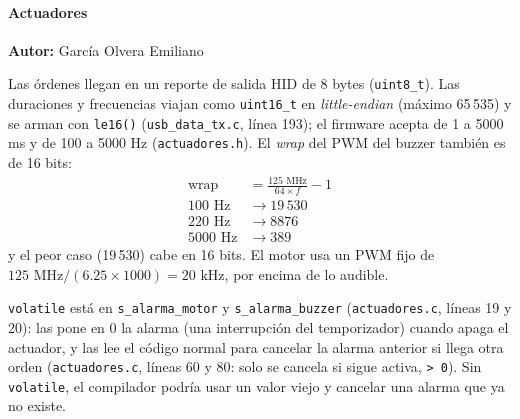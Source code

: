\paragraph{Actuadores}
\textbf{Autor:} García Olvera Emiliano

Las órdenes llegan en un reporte de salida HID de 8 bytes (\texttt{uint8\_t}). Las duraciones y frecuencias viajan
como \texttt{uint16\_t} en \textit{little-endian} (máximo 65\,535) y se arman con \texttt{le16()} (\texttt{usb\_data\_tx.c}, línea 193); el firmware acepta
de 1 a 5000 ms y de 100 a 5000 Hz (\texttt{actuadores.h}). El \textit{wrap} del PWM del buzzer también es de 16 bits:
\begin{align*}
\text{wrap} &= \frac{125\text{ MHz}}{64 \times f} - 1 \\
100\text{ Hz} &\rightarrow 19\,530 \\
220\text{ Hz} &\rightarrow 8876 \\
5000\text{ Hz} &\rightarrow 389
\end{align*}
y el peor caso (19\,530) cabe en 16 bits. El motor usa un PWM fijo de $125\text{ MHz} / (6.25 \times 1000) = 20\text{ kHz}$,
por encima de lo audible.

\texttt{volatile} está en \texttt{s\_alarma\_motor} y \texttt{s\_alarma\_buzzer} (\texttt{actuadores.c}, líneas 19 y 20):
las pone en 0 la alarma (una interrupción del temporizador) cuando apaga el actuador, y las lee el código normal
para cancelar la alarma anterior si llega otra orden (\texttt{actuadores.c}, líneas 60 y 80: solo se cancela si sigue
activa, \texttt{> 0}). Sin \texttt{volatile}, el compilador podría usar un valor viejo y cancelar una alarma que ya no existe.
